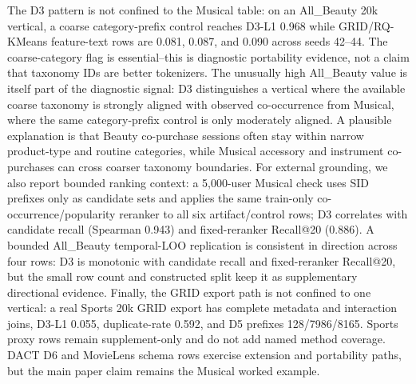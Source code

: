 The D3 pattern is not confined to the Musical table: on an All\_Beauty 20k vertical, a
coarse category-prefix control reaches D3-L1 0.968 while GRID/RQ-KMeans
feature-text rows are 0.081, 0.087, and 0.090 across seeds 42--44. The
coarse-category flag is essential--this is diagnostic portability evidence, not
a claim that taxonomy IDs are better tokenizers. The unusually high
All\_Beauty value is itself part of the diagnostic signal: D3 distinguishes a
vertical where the available coarse taxonomy is strongly aligned with observed
co-occurrence from Musical, where the same category-prefix control is only
moderately aligned. A plausible explanation is that Beauty co-purchase sessions
often stay within narrow product-type and routine categories, while Musical
accessory and instrument co-purchases can cross coarser taxonomy boundaries.
For external grounding, we also report bounded ranking context: a 5,000-user
Musical check uses SID prefixes only as candidate sets
and applies the same train-only co-occurrence/popularity reranker to all six
artifact/control rows; D3 correlates with candidate recall (Spearman 0.943) and
fixed-reranker Recall@20 (0.886). A bounded All\_Beauty temporal-LOO
replication is consistent in direction across four rows: D3 is monotonic with
candidate recall and fixed-reranker Recall@20, but the small row count and
constructed split keep it as supplementary directional evidence. Finally, the
GRID export path is not confined to one vertical: a real Sports 20k GRID export
has complete metadata and interaction joins, D3-L1 0.055, duplicate-\sid rate
0.592, and D5 prefixes 128/7986/8165. Sports proxy rows remain supplement-only
and do not add named method coverage. DACT D6 and MovieLens schema rows
exercise extension and portability paths, but the main paper claim remains the
Musical worked example.
